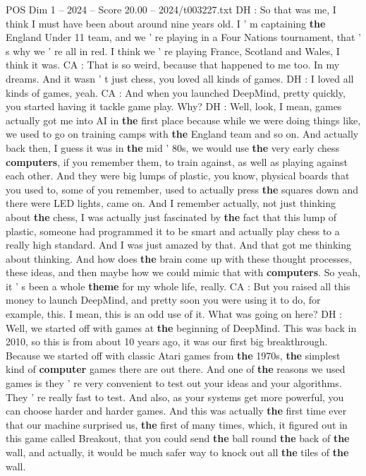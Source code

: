 \begin{textsample}{POS Dim 1 – 2024 – Score 20.00 – 2024/t003227.txt}
DH : So that was me, I think I must have been about around nine years old.
I ' m captaining \textbf{the} England Under 11 team, and we ' re playing in a Four Nations tournament, that ' s why we ' re all in red.
I think we ' re playing France, Scotland and Wales, I think it was.
CA : That is so weird, because that happened to me too.
In my dreams.
And it wasn ' t just chess, you loved all kinds of games.
DH : I loved all kinds of games, yeah.
CA : And when you launched DeepMind, pretty quickly, you started having it tackle game play.
Why?
DH : Well, look, I mean, games actually got me into AI in \textbf{the} first place because while we were doing things like, we used to go on training camps with \textbf{the} England team and so on.
And actually back then, I guess it was in \textbf{the} mid ' 80s, we would use \textbf{the} very early chess \textbf{computers}, if you remember them, to train against, as well as playing against each other.
And they were big lumps of plastic, you know, physical boards that you used to, some of you remember, used to actually press \textbf{the} squares down and there were LED lights, came on.
And I remember actually, not just thinking about \textbf{the} chess, I was actually just fascinated by \textbf{the} fact that this lump of plastic, someone had programmed it to be smart and actually play chess to a really high standard.
And I was just amazed by that.
And that got me thinking about thinking.
And how does \textbf{the} brain come up with these thought processes, these ideas, and then maybe how we could mimic that with \textbf{computers}.
So yeah, it ' s been a whole \textbf{theme} for my whole life, really.
CA : But you raised all this money to launch DeepMind, and pretty soon you were using it to do, for example, this.
I mean, this is an odd use of it.
What was going on here?
DH : Well, we started off with games at \textbf{the} beginning of DeepMind.
This was back in 2010, so this is from about 10 years ago, it was our first big breakthrough.
Because we started off with classic Atari games from \textbf{the} 1970s, \textbf{the} simplest kind of \textbf{computer} games there are out there.
And one of \textbf{the} reasons we used games is they ' re very convenient to test out your ideas and your algorithms.
They ' re really fast to test.
And also, as your systems get more powerful, you can choose harder and harder games.
And this was actually \textbf{the} first time ever that our machine surprised us, \textbf{the} first of many times, which, it figured out in this game called Breakout, that you could send \textbf{the} ball round \textbf{the} back of \textbf{the} wall, and actually, it would be much safer way to knock out all \textbf{the} tiles of \textbf{the} wall.

\end{textsample}
